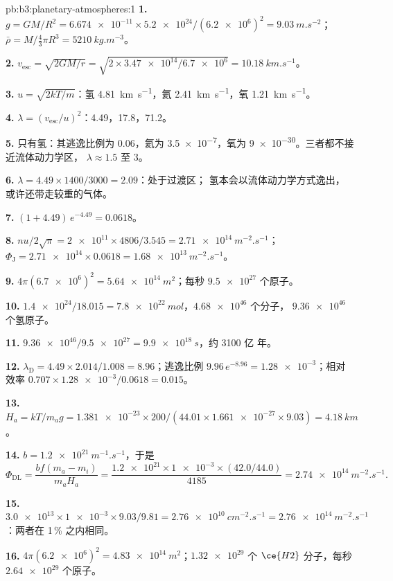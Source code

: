 \begin{solution}{pb:b3:planetary-atmospheres:1}
\textbf{1.} $g = GM/R^2 = \num{6.674e-11}\times\num{5.2e24}/(\num{6.2e6})^2 =
\qty{9.03}{m.s^{-2}}$；$\bar\rho = M/\tfrac43\pi R^3 = \qty{5210}{kg.m^{-3}}$。

\textbf{2.} $v_\mathrm{esc} = \sqrt{2GM/r} = \sqrt{2\times\num{3.47e14}/\num{6.7e6}}
= \qty{10.18}{km.s^{-1}}$。

\textbf{3.} $u = \sqrt{2kT/m}$：氢 \qty{4.81}{km.s^{-1}}，氦
\qty{2.41}{km.s^{-1}}，氧 \qty{1.21}{km.s^{-1}}。

\textbf{4.} $\lambda = (v_\mathrm{esc}/u)^2$：4.49，17.8，71.2。

\textbf{5.} 只有氢：其逃逸比例为 0.06，氦为
\num{3.5e-7}，氧为 \num{9e-30}。三者都不接近流体动力学区，
$\lambda \approx 1.5$ 至 3。

\textbf{6.} $\lambda = 4.49\times1400/3000 = 2.09$：处于过渡区；
氢本会以流体动力学方式逸出，
或许还带走较重的气体。

\textbf{7.} $(1 + 4.49)\,e^{-4.49} = 0.0618$。

\textbf{8.} $n u/2\sqrt\pi = \num{2e11}\times4806/3.545 = \qty{2.71e14}{m^{-2}.s^{-1}}$；
$\Phi_\mathrm J = \num{2.71e14}\times0.0618 = \qty{1.68e13}{m^{-2}.s^{-1}}$。

\textbf{9.} $4\pi(\num{6.7e6})^2 = \qty{5.64e14}{m^2}$；每秒
$\num{9.5e27}$ 个原子。

\textbf{10.} $\num{1.4e24}/18.015 = \qty{7.8e22}{mol}$，$\num{4.68e46}$ 个分子，
$\num{9.36e46}$ 个氢原子。

\textbf{11.} $\num{9.36e46}/\num{9.5e27} = \qty{9.9e18}{s}$，约 3100 亿
年。

\textbf{12.} $\lambda_\mathrm D = 4.49\times2.014/1.008 = 8.96$；逃逸比例
$9.96\,e^{-8.96} = \num{1.28e-3}$；相对效率 $0.707\times
\num{1.28e-3}/0.0618 = 0.015$。

\textbf{13.} $H_a = kT/m_a g = \num{1.381e-23}\times200/(44.01\times\num{1.661e-27}
\times9.03) = \qty{4.18}{km}$。

\textbf{14.} $b = \qty{1.2e21}{m^{-1}.s^{-1}}$，于是
\[
\Phi_\mathrm{DL} = \frac{b f(m_a - m_i)}{m_a H_a}
= \frac{\num{1.2e21}\times\num{1e-3}\times(42.0/44.0)}{4185}
= \qty{2.74e14}{m^{-2}.s^{-1}}.
\]

\textbf{15.} $\num{3.0e13}\times\num{1e-3}\times9.03/9.81 =
\qty{2.76e10}{cm^{-2}.s^{-1}} = \qty{2.76e14}{m^{-2}.s^{-1}}$：两者在
1\,\% 之内相同。

\textbf{16.} $4\pi(\num{6.2e6})^2 = \qty{4.83e14}{m^2}$；$\num{1.32e29}$ 个
$\ce{H2}$ 分子，每秒 $\num{2.64e29}$ 个原子。


\end{solution}
